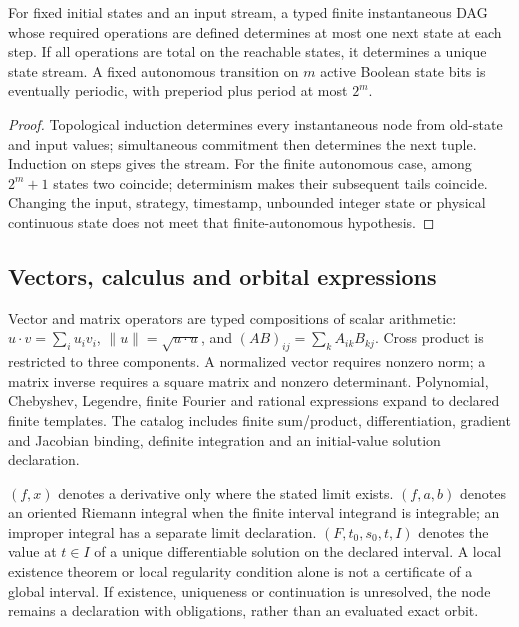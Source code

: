 \begin{proposition}
For fixed initial states and an input stream, a typed finite instantaneous DAG
whose required operations are defined determines at most one next state at each
step. If all operations are total on the reachable states, it determines a unique
state stream. A fixed autonomous transition on $m$ active Boolean state bits is
eventually periodic, with preperiod plus period at most $2^m$.
\end{proposition}
\begin{proof}
Topological induction determines every instantaneous node from old-state and
input values; simultaneous commitment then determines the next tuple. Induction
on steps gives the stream. For the finite autonomous case, among $2^m+1$ states
two coincide; determinism makes their subsequent tails coincide. Changing the
input, strategy, timestamp, unbounded integer state or physical continuous state
does not meet that finite-autonomous hypothesis.
\end{proof}

\subsection{Vectors, calculus and orbital expressions}
Vector and matrix operators are typed compositions of scalar arithmetic:
$u\cdot v=\sum_i u_i v_i$, $\|u\|=\sqrt{u\cdot u}$, and
$(AB)_{ij}=\sum_k A_{ik}B_{kj}$. Cross product is restricted to three
components. A normalized vector requires nonzero norm; a matrix inverse requires
a square matrix and nonzero determinant. Polynomial, Chebyshev, Legendre,
finite Fourier and rational expressions expand to declared finite templates.
The catalog includes finite sum/product, differentiation, gradient and Jacobian
binding, definite integration and an initial-value solution declaration.

$(f,x)$ denotes a derivative only where the stated limit exists.
$(f,a,b)$ denotes an oriented Riemann integral when the finite
interval integrand is integrable; an improper integral has a separate limit
declaration. $(F,t_0,s_0,t,I)$ denotes the value at $t\in I$ of a unique
differentiable solution on the declared interval. A local existence theorem or
local regularity condition alone is not a certificate of a global interval.
If existence, uniqueness or continuation is unresolved, the node remains a
declaration with obligations, rather than an evaluated exact orbit.

